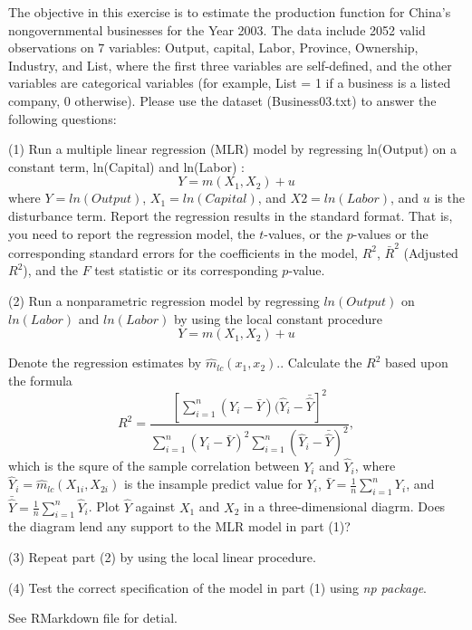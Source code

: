 \begin{problem}[17.1]
    The objective in this exercise is to estimate the production function for China’s nongovernmental businesses for the Year 2003. 
    The data include 2052 valid observations on $7$ variables: Output, capital, Labor, Province, Ownership, Industry, and List,  where the first three variables are self-defined, and the other variables are categorical variables (for example, List = 1 if a business is a listed company, 0 otherwise). 
    Please use the dataset (Business03.txt) to answer the following questions:
    
    (1) Run a multiple linear regression (MLR) model by regressing ln(Output) on a constant term, ln(Capital) and ln(Labor) :
    \begin{equation*}
        Y = m(X_1, X_2) + u
    \end{equation*}
    where $Y=ln(Output)$, $X_1=ln(Capital)$, and $X2=ln(Labor)$, and $u$ is the disturbance term. Report the regression results in the standard format. That is, you need to report the regression model, the $t$-values, or the $p$-values or the corresponding standard errors for the coefficients in the model, $R^2$, $\bar{R}^2$ (Adjusted $R^2$), and the $F$ test statistic or its corresponding $p$-value.

    (2) Run a nonparametric regression model by regressing $ln(Output)$ on $ln(Labor)$ and $ln(Labor)$ by using the local constant procedure
    \begin{equation*}
        Y = m(X_1, X_2) + u
    \end{equation*}

    Denote the regression estimates by $\hat{m}_{lc}(x_1,x_2).$. Calculate the $R^2$ based upon the formula
    \begin{equation*}
        R^2=\frac{[\sum_{i=1}^n(Y_i-\bar{Y})(\hat{Y}_i-\bar{\hat{Y}}]^2}{\sum_{i=1}^n(Y_i-\bar{Y})^2\sum_{i=1}^n(\hat{Y}_i-\bar{\hat{Y}})^2},
    \end{equation*}
    which is the squre of the sample correlation between $Y_i$ and $\hat{Y}_i$, where $\hat{Y}_i=\hat{m}_{lc}(X_{1i},X_{2i})$ is the insample predict value for $Y_i$,
    $\bar{Y}=\frac1n\sum_{i=1}^nY_i$, and $\bar{\hat{Y}}=\frac1n\sum_{i=1}^n\hat{Y}_i$. 
    Plot $\hat{Y}$ against $X_1$ and $X_2$ in a three-dimensional diagrm.
    Does the diagram lend any support to the MLR model in part (1)?

    (3) Repeat part (2) by using the local linear procedure. 

    (4) Test the correct specification of the model in part (1) using \emph{np package}.
\end{problem}

\begin{solution}
    See RMarkdown file for detial. 
\end{solution}